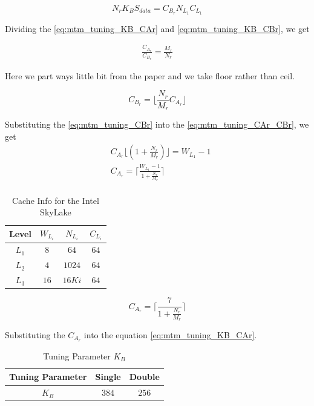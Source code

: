 \begin{equation}
    N_r K_B S_{data} = C_{B_r} N_{L_1} C_{L_1}
    \label{eq:mtm_tuning_KB_CBr}
\end{equation}

Dividing the \ref{eq:mtm_tuning_KB_CAr} and \ref{eq:mtm_tuning_KB_CBr}, we get

\begin{align*}
    \frac{C_{A_r}}{C_{B_r}} = \frac{M_r}{N_r}
\end{align*}

Here we part ways little bit from the paper and we take floor rather than ceil.

\begin{equation}
    C_{B_r} = \lfloor \frac{N_r}{M_r} C_{A_r} \rfloor
    \label{eq:mtm_tuning_CBr}
\end{equation}

Substituting the \ref{eq:mtm_tuning_CBr} into the \ref{eq:mtm_tuning_CAr_CBr}, we get
\begin{align*}
    &C_{A_r} \lfloor ( 1 + \frac{N_r}{M_r} ) \rfloor = W_{L_1} - 1\\
    &C_{A_r} = \lceil \frac{W_{L_1} - 1}{1 + \frac{N_r}{M_r}} \rceil\\
\end{align*}

\begin{table}[ht]
    \centering
    \caption{Cache Info for the Intel SkyLake}
    \begin{tabular}{|c|c|c|c|}
        \hline
        \textbf{Level} & \textbf{$W_{L_i}$} & \textbf{$N_{L_i}$} & \textbf{$C_{L_i}$}\\
        \hline
        $L_1$   & $8$ & $64$ & $64$ \\
        \hline
        $L_2$   & $4$ & $1024$ & $64$ \\
        \hline
        $L_3$   & $16$ & $16Ki$ & $64$ \\
        \hline
    \end{tabular}
\end{table}

\[
    C_{A_r} = \lceil \frac{7}{1 + \frac{N_r}{M_r}} \rceil
\]

Substituting the $C_{A_r}$ into the equation \ref{eq:mtm_tuning_KB_CAr}.

\begin{table}[ht]
    \centering
    \caption{Tuning Parameter $K_B$}
    \begin{tabular}{|c|c|c|}
        \hline
        \textbf{Tuning Parameter} & \textbf{Single} & \textbf{Double}\\
        \hline
        $K_B$   & $384$ & $256$ \\
        \hline
    \end{tabular}
\end{table}

